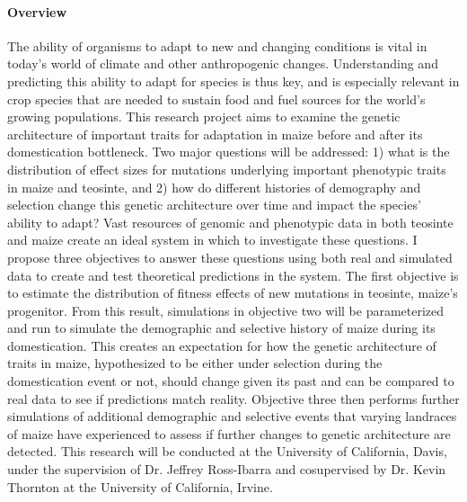 


\paragraph{Overview} 

The ability of organisms to adapt to new and changing conditions is vital in today's world of climate and other anthropogenic changes. Understanding and predicting this ability to adapt for species is thus key, and is especially relevant in crop species that are needed to sustain food and fuel sources for the world's growing populations. This research project aims to examine the genetic architecture of important traits for adaptation in maize before and after its domestication bottleneck. Two major questions will be addressed: 1) what is the distribution of effect sizes for mutations %
underlying important phenotypic traits in maize and teosinte, and 2) how do different histories of demography and selection change this genetic architecture over time and impact the species' ability to adapt? Vast resources of genomic and phenotypic data in both teosinte and maize create an ideal system in which to investigate these questions. I propose three objectives to answer these questions using both real and simulated data to create and test theoretical predictions in the system. The first objective is to estimate the distribution of fitness effects of new mutations in teosinte, maize's progenitor. From this result, simulations in objective two will be parameterized and run to simulate %
the demographic and selective history of maize during its domestication. This creates an expectation for how the genetic architecture of traits in maize, hypothesized to be either under selection during the domestication event or not, should change given its past and can be compared to real data to see if predictions match reality. Objective three then performs further simulations of additional demographic and selective events that varying landraces of maize have experienced to assess if further changes to genetic architecture are detected. This research will be conducted at the University of California, Davis, under the supervision of Dr. Jeffrey Ross\--Ibarra and cosupervised by Dr. Kevin Thornton at the University of California, Irvine.

